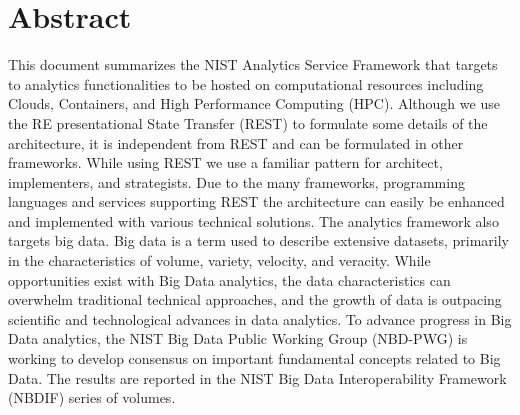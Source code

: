 
\section*{Abstract}

\normalsize This document summarizes the NIST Analytics Service
Framework that targets to analytics functionalities to be hosted on
computational resources including Clouds, Containers, and High
Performance Computing (HPC). Although we use the RE presentational
State Transfer (REST) to formulate some details of the architecture,
it is independent from REST and can be formulated in other
frameworks. While using REST we use a familiar pattern for architect,
implementers, and strategists. Due to the many frameworks, programming
languages and services supporting REST the architecture can easily be
enhanced and implemented with various technical solutions.  The
analytics framework also targets big data. Big data is a term used to
describe extensive datasets, primarily in the characteristics of
volume, variety, velocity, and veracity. While opportunities exist
with Big Data analytics, the data characteristics can overwhelm
traditional technical approaches, and the growth of data is outpacing
scientific and technological advances in data analytics. To advance
progress in Big Data analytics, the NIST Big Data Public Working Group
(NBD-PWG) is working to develop consensus on important fundamental
concepts related to Big Data. The results are reported in the NIST Big
Data Interoperability Framework (NBDIF) series of volumes.\\
